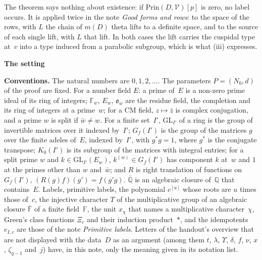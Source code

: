 \documentclass[11pt,a4paper]{article}
\newcommand{\F}{\mathbb{F}}
\newcommand{\m}[1]{\mbox{$#1$}}        %
\newcommand{\sect}[2]{\refstepcounter{section}\label{#2}\par\addvspace{19pt plus 4pt minus 2pt}\Needspace{7\baselineskip}%
  \noindent\llap{{\fontsize{13.2}{16}\selectfont\bfseries\color{inkfaint}\thesection}\hspace{9pt}}%
  {\fontsize{13.2}{16}\selectfont\bfseries\color{ink}#1}\par\nopagebreak\vspace{-1pt}}
\theoremstyle{plainx}
\theoremstyle{uprightx}
\newenvironment{conventions}{\par\addvspace{5pt}\noindent\textbf{Conventions.}\enspace\ignorespaces}{\par\addvspace{3pt}}
\newcommand{\cV}{{\mathcal V}}
\newcommand{\GL}{\mathrm{GL}}
\begin{document}
The theorem says nothing about existence: if \m{\mathrm{Prin}(D,\cV)[p]} is zero, no label occurs. It is applied
twice in the note \emph{Good forms and rows}: to the space of the rows, with $L$ the chain of $m(D)$ theta lifts
to a definite space, and to the source of each single lift, with $L$ that lift. In both cases the lift carries
the cuspidal type at~$v$ into a type induced from a parabolic subgroup, which is what (iii) expresses.

\sect{The setting}{s:setting}
\begin{conventions}\label{c:conventions}
The natural numbers are \m{0,1,2,\dots}. The parameters \m{P=(N_0,d)} of the proof are fixed. For a number field
$E$: a prime of~$E$ is a non-zero prime ideal of its ring of integers; $\F_w$, $E_w$, $\mathfrak{o}_w$ are the residue
field, the completion and its ring of integers at a prime~$w$; for a CM field, \m{z\mapsto\bar z} is complex
conjugation, and a prime $w$ is split if \m{\bar w\ne w}. For a finite set~$I'$, \m{\GL_{I'}} of a ring is the group
of invertible matrices over it indexed by~$I'$; \m{G_f(I')} is the group of the matrices $g$ over the finite
adeles of~$E$, indexed by~$I'$, with \m{g^*g=1}, where $g^*$ is the conjugate transpose; \m{K_0(I')} is its
subgroup of the matrices with integral entries; for a split prime $w$ and \m{k\in\GL_{I'}(E_w)}, \m{k^{(w)}\in G_f(I')}
has component $k$ at~$w$ and $1$ at the primes other than $w$ and~$\bar w$; and $R$ is right translation of
functions on~$G_f(I')$, \m{(R(g)f)(g')=f(g'g)}. $\bar{\mathbb Q}$ is an algebraic closure of~$\mathbb Q$ that
contains~$E$. Labels, primitive labels, the polynomial \m{c^{[u]}} whose roots are $u$ times those of~$c$, the
injective character $T$ of the multiplicative group of an algebraic closure $\bar{\F}$ of a finite field~$\F$,
the unit $x_\chi$ that names a multiplicative character~$\chi$, Green's class functions $\Xi_c$ and their
induction product~$*$, and the idempotents \m{e_{I,c}} are those of the note \emph{Primitive labels}. Letters of
the handout's overview that are not displayed with the data~$D$ as an argument (among them $t$, $\lambda$,
$\Upsilon$, $\delta$, $f$, $\nu$, $x$, $\zeta_{q-1}$ and~$j$) have, in this note, only the meaning given in its notation list.
\end{conventions}
\end{document}
